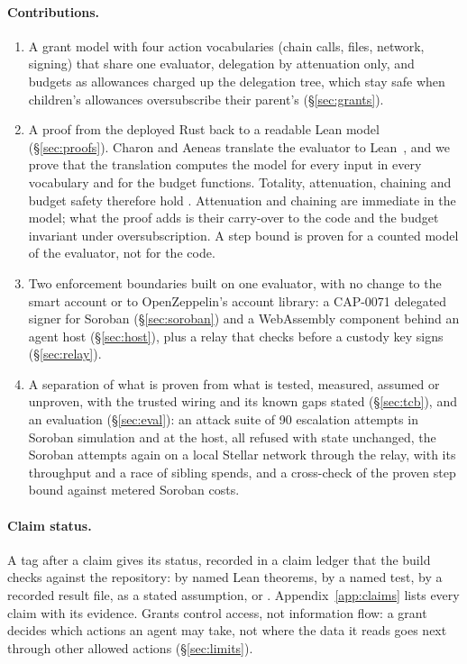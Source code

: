 \paragraph{Contributions.}
\begin{enumerate}
\item A grant model with four action vocabularies (chain calls, files,
  network, signing) that share one evaluator, delegation by attenuation only,
  and budgets as allowances charged up the delegation tree, which stay safe
  when children's allowances oversubscribe their parent's
  (\S\ref{sec:grants}).
\item A proof from the deployed Rust back to a readable Lean model
  (\S\ref{sec:proofs}). Charon and Aeneas translate the evaluator to
  Lean~\cite{charon,aeneas,lean4}, and we prove that the translation computes
  the model for every input in every vocabulary and for the budget functions.
  Totality, attenuation, chaining and budget safety therefore hold
  \translationtrust. Attenuation and chaining are immediate in the model; what
  the proof adds is their carry-over to the code and the budget invariant
  under oversubscription. A step bound is proven for a counted model of the
  evaluator, not for the code.
\item Two enforcement boundaries built on one evaluator, with no change to the
  smart account or to OpenZeppelin's account library: a CAP-0071 delegated
  signer for Soroban (\S\ref{sec:soroban}) and a WebAssembly component behind
  an agent host (\S\ref{sec:host}), plus a relay that checks before a custody
  key signs (\S\ref{sec:relay}).
\item A separation of what is proven from what is tested, measured, assumed
  or unproven, with the trusted wiring and its known gaps stated
  (\S\ref{sec:tcb}), and an evaluation (\S\ref{sec:eval}): an attack suite of
  90 escalation attempts in Soroban simulation and at the host, all refused
  with state unchanged, the Soroban attempts again on a local Stellar network
  through the relay, with its throughput and a race of sibling spends, and a
  cross-check of the proven step bound against metered Soroban costs.
\end{enumerate}

\paragraph{Claim status.} A tag after a claim gives its status, recorded in a
claim ledger that the build checks against the repository: 
by named Lean theorems,  by a named test,
 by a recorded result file,  as a stated
assumption, or . Appendix~\ref{app:claims} lists every
claim with its evidence. Grants control access, not information flow: a grant
decides which actions an agent may take, not where the data it reads goes next
through other allowed actions (\S\ref{sec:limits}).
